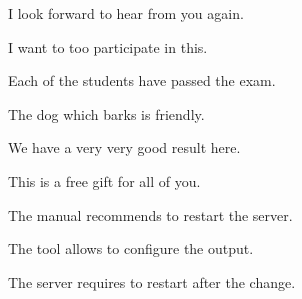 \documentclass{article}
\begin{document}
I look forward to hear from you again.

I want to too participate in this.

Each of the students have passed the exam.

The dog which barks is friendly.

We have a very very good result here.

This is a free gift for all of you.

The manual recommends to restart the server.

The tool allows to configure the output.

The server requires to restart after the change.
\end{document}
